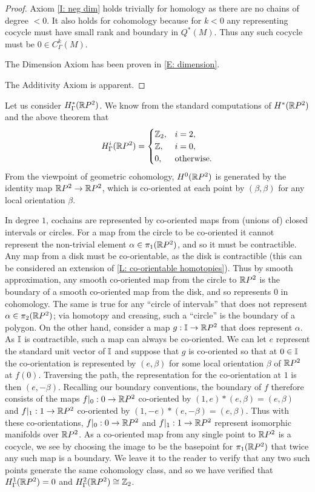 \begin{proof}
Axiom \ref{I: neg dim} holds trivially for homology as there are no chains of degree $<0$. It also holds for cohomology because for $k<0$ any representing cocycle must have small rank and boundary in $Q^*(M)$. Thus any such cocycle must be $0 \in C^k_\Gamma(M)$.

The Dimension Axiom has been proven in \cref{E: dimension}.

The Additivity Axiom is apparent.
\end{proof}


\begin{example}
Let us consider $H^*_\Gamma(\mathbb{R} P^2)$. We know from the standard computations of $H^*(\mathbb{R} P^2)$ and the above theorem that
\begin{equation*}
H_\Gamma^i(\mathbb{R} P^2) =
\begin{cases}
\mathbb{Z}_2,&i = 2,\\
\mathbb{Z},&i = 0,\\
0,&\text{otherwise.}
\end{cases}
\end{equation*}
From the viewpoint of geometric cohomology, $H^0(\mathbb{R} P^2)$ is generated by the identity map $\mathbb{R} P^2 \to \mathbb{R} P^2$, which is co-oriented at each point by $(\beta,\beta)$ for any local orientation $\beta$.

In degree $1$, cochains are represented by co-oriented maps from (unions of) closed intervals or circles. For a map from the circle to be co-oriented it cannot represent the non-trivial element $\alpha \in \pi_1(\mathbb{R} P^2)$, and so it must be contractible. Any map from a disk must be co-orientable, as the disk is contractible (this can be considered an extension of \cref{L: co-orientable homotopies}). Thus by smooth approximation, any smooth co-oriented map from the circle to $\mathbb{R} P^2$ is the boundary of a smooth co-oriented map from the disk, and so represents $0$ in cohomology. The same is true for any ``circle of intervals'' that does not represent $\alpha \in \pi_2(\mathbb{R} P^2)$; via homotopy and creasing, such a ``circle'' is the boundary of a polygon. On the other hand, consider a map $g:\mathbb{I} \to \mathbb{R} P^2$ that does represent $\alpha$. As $\mathbb{I}$ is contractible, such a map can always be co-oriented. We can let $e$ represent the standard unit vector of $\mathbb{I}$ and suppose that $g$ is co-oriented so that at $0 \in \mathbb{I}$ the co-orientation is represented by $(e,\beta)$ for some local orientation $\beta$ of $\mathbb{R} P^2$ at $f(0)$. Traversing the path, the representation for the co-orientation at $1$ is then $(e,-\beta)$. Recalling our boundary conventions, the boundary of $f$ therefore consists of the maps $f|_0:0 \to \mathbb{R} P^2$ co-oriented by $(1,e)*(e,\beta) = (e,\beta)$ and $f|_1:1 \to \mathbb{R} P^2$ co-oriented by $(1,-e)*(e,-\beta) = (e,\beta)$. Thus with these co-orientations, $f|_0:0 \to \mathbb{R} P^2$ and $f|_1:1 \to \mathbb{R} P^2$ represent isomorphic manifolds over $\mathbb{R} P^2$. As a co-oriented map from any single point to $\mathbb{R} P^2$ is a cocycle, we see by choosing the image to be the basepoint for $\pi_1(\mathbb{R} P^2)$ that twice any such map is a boundary. We leave it to the reader to verify that any two such points generate the same cohomology class, and so we have verified that $H^1_\Gamma(\mathbb{R} P^2) = 0$ and $H_\Gamma^2(\mathbb{R} P^2) \cong \mathbb{Z}_2$.
\end{example}

